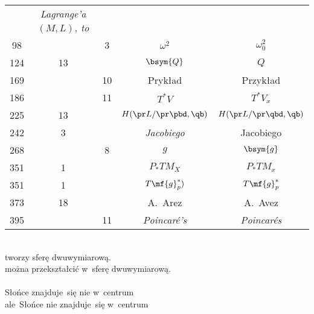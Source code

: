 \documentclass[a4paper,11pt]{article}
\begin{document}
\begin{center}
\begin{tabular}{|c|c|c|c|c|}
           & \emph{Lagrange'a $( M, L )$, to} \\
    98  & &  3 & $\omega^{ 2 }$ & $\omega_{ 0 }^{ 2 }$ \\
    124 & 13 & & $\bsym{Q}$ & $Q$ \\
    169 & & 10 & Prykład & Przykład \\
    186 & & 11 & $T^{ * }V$ & $T^{ * }V_{ x }$ \\
    225 & 13 & & $H( \pr L / \pr \pbd, \qb )$
           & $H( \pr L / \pr \qbd, \qb )$ \\
    242 & 3 & & \emph{Jacobiego} & Jacobiego \\
    268 & &  8 & $g$ & $\bsym{g}$ \\
    351 &  1 & & $P_{ * }TM_{ X }$ & $P_{ * }TM_{ x }$ \\
    351 &  1 & & $T\mf{g}_{ p }^{ * })$ & $T\mf{g}_{ p }^{ * }$ \\
    373 & 18 & & A.~Arez & A.~Avez \\
    395 & & 11 & \emph{Poincar\'{e}'s} & \emph{Poincar\'{e}s} \\
    \hline
  \end{tabular}
\end{center}
\noi
{} \\
\Jest tworzy sferę dwuwymiarową. \\
\Pow   można przekształcić w~sferę dwuwymiarową. \\
 \\
\Jest Słońce znajduje~się nie w~centrum \\
\Pow  ale~Słońce nie znajduje~się w~centrum \\

\vspace{\spaceTwo}












\start {}
\end{document}
